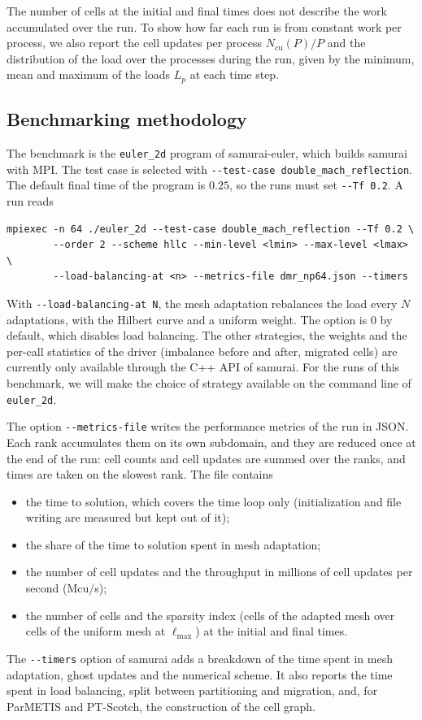 The number of cells at the initial and final times does not describe the work
accumulated over the run. To show how far each run is from constant work per
process, we also report the cell updates per process $N_{\mathrm{cu}}(P)/P$ and
the distribution of the load over the processes during the run, given by the
minimum, mean and maximum of the loads $L_p$ at each time step.



\subsection{Benchmarking methodology}

The benchmark is the \texttt{euler\_2d} program of samurai-euler, which builds
samurai with MPI. The test case is selected with
\texttt{-{}-test-case double\_mach\_reflection}. The default final time of the
program is $0.25$, so the runs must set \texttt{-{}-Tf 0.2}. A run reads
\begin{verbatim}
mpiexec -n 64 ./euler_2d --test-case double_mach_reflection --Tf 0.2 \
        --order 2 --scheme hllc --min-level <lmin> --max-level <lmax> \
        --load-balancing-at <n> --metrics-file dmr_np64.json --timers
\end{verbatim}

With \texttt{-{}-load-balancing-at N}, the mesh adaptation rebalances the load
every $N$ adaptations, with the Hilbert curve and a uniform weight. The option
is 0 by default, which disables load balancing. The other strategies, the
weights and the per-call statistics of the driver (imbalance before and after,
migrated cells) are currently only available through the C++ API of samurai.
For the runs of this benchmark, we will make the choice of strategy available
on the command line of \texttt{euler\_2d}.

The option \texttt{-{}-metrics-file} writes the performance metrics of the run in
JSON. Each rank accumulates them on its own subdomain, and they are reduced
once at the end of the run: cell counts and cell updates are summed over the
ranks, and times are taken on the slowest rank. The file contains
\begin{itemize}
\item the time to solution, which covers the time loop only (initialization and
  file writing are measured but kept out of it);
\item the share of the time to solution spent in mesh adaptation;
\item the number of cell updates and the throughput in millions of cell updates
  per second (Mcu/s);
\item the number of cells and the sparsity index (cells of the adapted mesh over
  cells of the uniform mesh at $\ell_{\max}$) at the initial and final times.
\end{itemize}
The \texttt{-{}-timers} option of samurai adds a breakdown of the time spent in
mesh adaptation, ghost updates and the numerical scheme. It also reports the
time spent in load balancing, split between partitioning and migration, and,
for ParMETIS and PT-Scotch, the construction of the cell graph.

